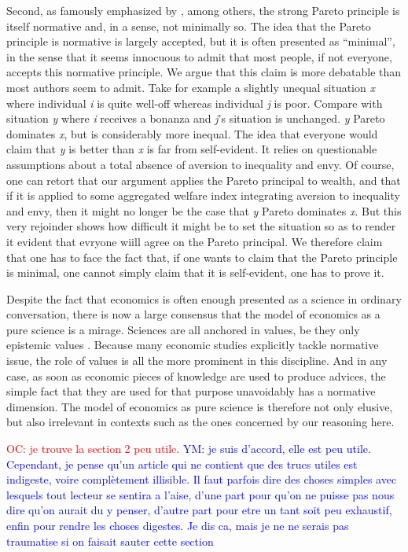 \documentclass[preprint,11pt]{elsarticle}
\newcommand{\commentYM}[1]{\textcolor{blue}{YM: #1}}
\newcommand{\commentOC}[1]{\textcolor{red}{OC: #1}}
\begin{document}
Second, as famously emphasized by \cite{sen_rationality_2004}, among others, the strong Pareto principle is itself normative and, in a sense, not minimally so. The idea that the Pareto principle is normative is largely accepted, but it is often presented as ``minimal'', in the sense that it seems innocuous to admit that most people, if not everyone, accepts this normative principle. We argue that this claim is more debatable than most authors seem to admit. Take for example a slightly unequal situation \emph{x} where individual \emph{i} is quite well-off whereas individual \emph{j} is poor. Compare with situation \emph{y} where \emph{i} receives a bonanza and \emph{j}'s situation is unchanged. \emph{y} Pareto dominates \emph{x}, but is considerably more inequal. The idea that everyone would claim that \emph{y} is better than \emph{x} is far from self-evident. It relies on questionable assumptions about a total absence of aversion to inequality and envy. Of course, one can retort that our argument applies the Pareto principal to wealth, and that if it is applied to some aggregated welfare index integrating aversion to inequality and envy, then it might no longer be the case that \emph{y} Pareto dominates \emph{x}. But this very rejoinder shows how difficult it might be to set the situation so as to render it evident that evryone wiill agree on the Pareto principal. We therefore claim that one has to face the fact that, if one wants to claim that the Pareto principle is minimal, one cannot simply claim that it is self-evident, one has to prove it.

Despite the fact that economics is often enough presented as a science in ordinary conversation, there is now a large consensus that the model of economics as a pure science is a mirage. Sciences are all anchored in values, be they only epistemic values \cite{longino_science_1990}. Because many economic studies explicitly tackle normative issue, the role of values is all the more prominent in this discipline. And in any case, as soon as economic pieces of knowledge are used to produce advices, the simple fact that they are used for that purpose unavoidably has a normative dimension. The model of economics as pure science is therefore not only elusive, but also irrelevant in contexts such as the ones concerned by our reasoning here.

\commentOC{je trouve la section 2 peu utile.}
\commentYM{je suis d'accord, elle est peu utile. Cependant, je pense qu'un article qui ne contient que des trucs utiles est indigeste, voire complètement illisible. Il faut parfois dire des choses simples avec lesquels tout lecteur se sentira a l'aise, d'une part pour qu'on ne puisse pas nous dire qu'on aurait du y penser, d'autre part pour etre un tant soit peu exhaustif, enfin pour rendre les choses digestes. Je dis ca, mais je ne ne serais pas traumatise si on faisait sauter cette section}
\end{document}
